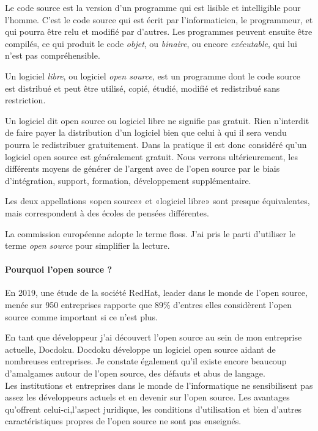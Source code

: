 		Le code source est la version d'un programme qui est lisible et intelligible pour l'homme. C'est le code source qui est écrit par l'informaticien, le programmeur, et qui pourra être relu et modifié par d'autres. Les programmes peuvent ensuite être compilés, ce qui produit le code \textit{objet}, ou \textit{binaire}, ou encore \textit{exécutable}, qui lui n'est pas compréhensible.

		Un logiciel \textit{libre}, ou logiciel \textit{open source}, est un programme dont le code source est distribué et peut être utilisé, copié, étudié, modifié et redistribué sans restriction.

		Un logiciel dit open source ou logiciel libre ne signifie pas gratuit.
		Rien n'interdit de faire payer la distribution d'un logiciel bien que celui à qui il sera vendu pourra le redistribuer gratuitement.
		Dans la pratique il est donc considéré qu'un logiciel open source est généralement gratuit. Nous verrons ultérieurement, les différents moyens de générer de l'argent avec de l'open source par le biais d'intégration, support, formation, développement supplémentaire.

		Les deux appellations «open source» et «logiciel libre» sont presque équivalentes, mais correspondent à des écoles de pensées différentes.

		La commission européenne adopte le terme \acrfull{floss}. J'ai pris le parti d'utiliser le terme \textit{open source} pour simplifier la lecture.
		
		
		\paragraph{Pourquoi l'open source ?\\}

		En 2019, une étude de la société RedHat, leader dans le monde de l'open source, menée sur 950 entreprises rapporte que 89\% d'entres elles  considèrent l'open source comme important si ce n'est plus.

		En tant que développeur j'ai découvert l'open source au sein de mon entreprise actuelle, Docdoku.
		Docdoku développe un logiciel open source aidant de nombreuses entreprises.
		Je constate également qu'il existe encore beaucoup d'amalgames autour de l'open source, des défauts et abus de langage.\\
		Les institutions et entreprises dans le monde de l'informatique ne sensibilisent pas assez les développeurs actuels et en devenir sur l'open source. Les avantages qu'offrent celui-ci,l'aspect juridique, les conditions d'utilisation et bien d'autres caractéristiques propres de l'open source ne sont pas enseignés.\\

